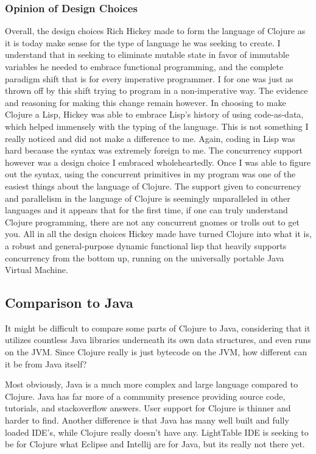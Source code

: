 \subsubsection{Opinion of Design Choices}

    Overall, the design choices Rich Hickey made to form the language of Clojure as it is today make sense for the type of language he was seeking to create. I understand that in seeking to eliminate mutable state in favor of immutable variables he needed to embrace functional programming, and the complete paradigm shift that is for every imperative programmer. I for one was just as thrown off by this shift trying to program in a non-imperative way. The evidence and reasoning for making this change remain however. In choosing to make Clojure a Lisp, Hickey was able to embrace Lisp's history of using code-as-data, which helped immensely with the typing of the language. This is not something I really noticed and did not make a difference to me. Again, coding in Lisp was hard because the syntax was extremely foreign to me. The concurrency support however was a design choice I embraced wholeheartedly. Once I was able to figure out the syntax, using the concurrent primitives in my program was one of the easiest things about the language of Clojure. The support given to concurrency and parallelism in the language of Clojure is seemingly unparalleled in other languages and it appears that for the first time, if one can truly understand Clojure programming, there are not any concurrent gnomes or trolls out to get you. All in all the design choices Hickey made have turned Clojure into what it is, a robust and general-purpose dynamic functional lisp that heavily supports concurrency from the bottom up, running on the universally portable Java Virtual Machine.

\subsection{Comparison to Java}

    It might be difficult to compare some parts of Clojure to Java, considering that it utilizes countless Java libraries underneath its own data structures, and even runs on the JVM. Since Clojure really is just bytecode on the JVM, how different can it be from Java itself?
    
    Most obviously, Java is a much more complex and large language compared to Clojure. Java has far more of a community presence providing source code, tutorials, and stackoverflow answers. User support for Clojure is thinner and harder to find. Another difference is that Java has many well built and fully loaded IDE's, while Clojure really doesn't have any. LightTable IDE is seeking to be for Clojure what Eclipse and Intellij are for Java, but its really not there yet.
    
